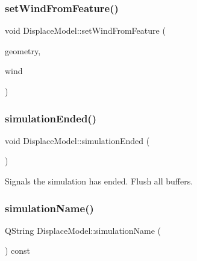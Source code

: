 \mbox{\label{class_displace_model_ae1a1d3f5ebf3d8fe2088822f70939346}} 
\subsubsection{\texorpdfstring{setWindFromFeature()}{setWindFromFeature()}}
{\footnotesize\ttfamily void Displace\+Model\+::set\+Wind\+From\+Feature (\begin{DoxyParamCaption}\item[{O\+G\+R\+Geometry $\ast$}]{geometry,  }\item[{double}]{wind }\end{DoxyParamCaption})}

\mbox{\label{class_displace_model_a8629941afc5c45929ff2e9c940850ca7}} 
\subsubsection{\texorpdfstring{simulationEnded()}{simulationEnded()}}
{\footnotesize\ttfamily void Displace\+Model\+::simulation\+Ended (\begin{DoxyParamCaption}{ }\end{DoxyParamCaption})}



Signals the simulation has ended. Flush all buffers. 

\mbox{\label{class_displace_model_a836396799089957b340a4da985550f02}} 
\subsubsection{\texorpdfstring{simulationName()}{simulationName()}}
{\footnotesize\ttfamily Q\+String Displace\+Model\+::simulation\+Name (\begin{DoxyParamCaption}{ }\end{DoxyParamCaption}) const\hspace{0.3cm}{\ttfamily [inline]}}

